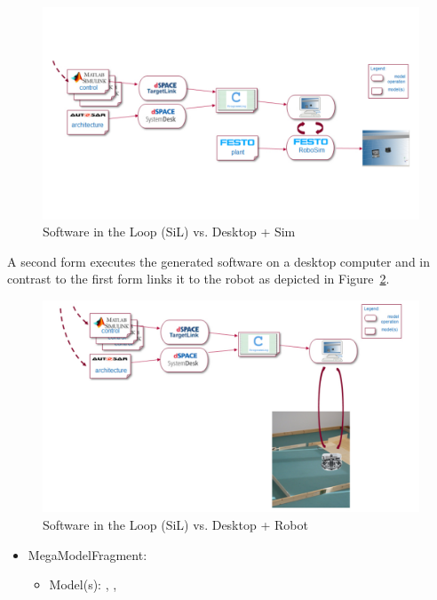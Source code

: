 \begin{figure}[!htb]
\centering
\includegraphics[scale=0.33]{figures/mm-hpi7.pdf}
\caption{Software in the Loop (SiL) vs. Desktop + Sim}
\label{fig:MMFig7}
\end{figure}

A second form executes the generated software  on a desktop computer and in contrast to the first form links it to the robot as depicted in Figure~\ref{fig:MMFig8}.

\begin{figure}[!htb]
\centering
\includegraphics[scale=0.33]{figures/mm-hpi8.pdf}
\caption{Software in the Loop (SiL) vs. Desktop + Robot}
\label{fig:MMFig8}
\end{figure}

%

\begin{itemize}
    \item MegaModelFragment: \CPSLabSiLaMMF
    \begin{itemize}
        \item Model(s): \CPSLabControlModel*, \CPSLabSystemModel, \CPSLabRobotModel
    \end{itemize}
\end{itemize}

